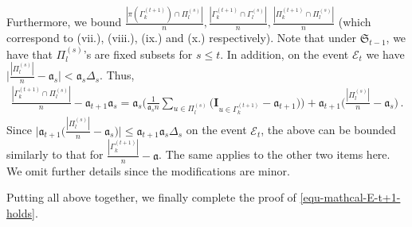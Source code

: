 \documentclass[11pt]{article}
\numberwithin{equation}{section}
\begin{document}
Furthermore, we bound $\frac{ | \pi(\Gamma^{(t+1)}_k) \cap \Pi^{(s)}_l |}{n}, \frac{ | \Gamma^{(t+1)}_k \cap \Gamma^{(s)}_l |}{n}, \frac{ | \Pi^{(t+1)}_k \cap \Pi^{(s)}_l |}{n} $ (which correspond to (vii.), (viii.), (ix.) and (x.) respectively). Note that under $\mathfrak{S}_{t-1}$, we have that $\Pi^{(s)}_l$'s are fixed subsets for $s\leq t$. In addition, on the event $\mathcal{E}_{t}$ we have $\Big| \frac{| \Pi^{(s)}_l |}{n} - \mathfrak{a}_s \Big| < \mathfrak{a}_s \Delta_s$. Thus,
\begin{align*}
    \frac{ | \Gamma^{(t+1)}_k \cap \Pi^{(s)}_l |}{n} - \mathfrak{a}_{t+1} \mathfrak{a}_s = \mathfrak{a}_{s} \Big( \frac{1}{\mathfrak{a}_s n}  \sum_{ u \in \Pi^{(s)}_l } \Big( \mathbf{I}_{ u \in \Gamma^{(t+1)}_k } - \mathfrak{a}_{t+1} \Big) \Big) + \mathfrak{a}_{t+1} \Big( \frac{|\Pi^{(s)}_l|}{n} - \mathfrak{a}_{s} \Big)\,.
\end{align*}
Since $\Big| \mathfrak{a}_{t+1} \Big( \frac{|\Pi^{(s)}_l|}{n} - \mathfrak{a}_{s} \Big) \Big| \leq \mathfrak{a}_{t+1} \mathfrak{a}_s \Delta_s$ on the event $\mathcal{E}_{t}$, the above can be bounded similarly to that for $\frac{|\Gamma^{(t+1)}_k |}{n} - \mathfrak{a}$. The same applies to the other two items here. We omit further details since the modifications are minor.
 
Putting all above together, we finally complete the proof of \eqref{equ-mathcal-E-t+1-holds}.
\end{document}
